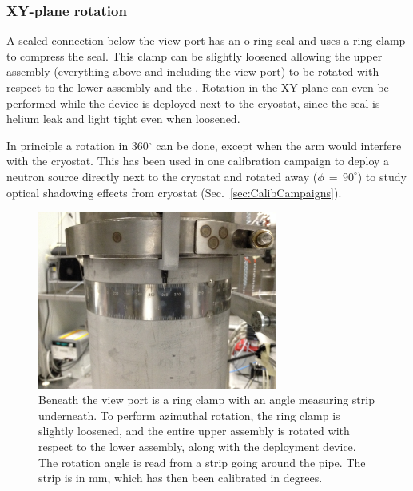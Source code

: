 \subsubsection{XY-plane rotation}\label{sec:XYrotation}
A sealed connection below the view port has an o-ring seal and uses a ring clamp to compress the seal. This clamp can be slightly loosened allowing the upper assembly (everything above and including the view port) to be rotated with respect to the lower assembly and the \tpc. Rotation in the XY-plane can even be performed while the device is deployed next to the cryostat, since the seal is helium leak and light tight even when loosened.

In principle a rotation in 360$^\circ$ can be done, except when the arm would interfere with the cryostat. This has been used in one calibration campaign to deploy a neutron source directly next to the cryostat and rotated away ($\phi\,=\,90^\circ$) to study optical shadowing effects from cryostat (Sec.~\ref{sec:CalibCampaigns}). 





\begin{figure}[htbp]
 \centering
  \includegraphics[width=0.7\textwidth]{Figures/RingClamp_WithPin_IMG_2669.JPG}
  \caption{Beneath the view port is a ring clamp with an angle measuring strip underneath. To perform azimuthal rotation, the ring clamp is slightly loosened, and the entire upper assembly is rotated with respect to the lower assembly, along with the deployment device. The rotation angle is read from a strip going around the pipe. The strip is in mm, which has then been calibrated in degrees.}
  \label{fig:ring_clamp}
\end{figure} 

